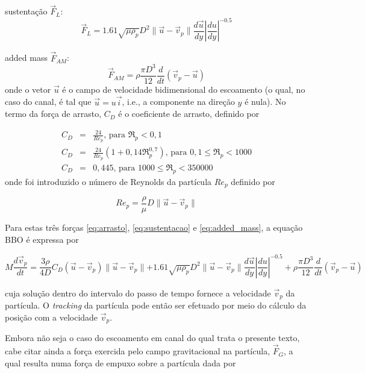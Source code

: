 sustentação $\vec{F}_L$:
\begin{equation}
\vec{F}_L = 1.61\sqrt{\mu\rho_p}D^2\parallel\vec{u}-\vec{v}_p\parallel\frac{d\vec{u}}{dy}\left|\frac{du}{dy}\right|^{-0.5}
\label{eq:sustentacao}
\end{equation}

added mass $\vec{F}_{AM}$:
\begin{equation}
\vec{F}_{AM} = \rho\frac{\pi D^3}{12}\frac{d}{dt}(\vec{v}_p-\vec{u})
\label{eq:added_mass}
\end{equation}
onde o vetor $\vec{u}$ é o campo de velocidade bidimensional do
escoamento (o qual, no caso do canal, é tal que $\vec{u}=u\vec{i}$,
i.e., a componente na direção $y$ é nula). No termo da força de arrasto,
$C_D$ é o coeficiente de arrasto, definido por \cite{PERRY99}

\begin{eqnarray}
	C_D &=& \frac{24}{Re_p}\text{, para }\Re_p< 0,1\nonumber\\
	C_D &=& \frac{24}{Re_p}\left(1+0,14\Re_p^{0,7}\right)\text{, para }0,1\leq\Re_p< 1000\\
	C_D &=& 0,445\text{, para }1000\leq\Re_p< 350000\nonumber
\end{eqnarray}
onde foi introduzido o número de Reynolds da partícula $Re_p$ definido
por

\begin{equation}
	Re_p = \frac{\rho}{\mu}D\parallel\vec{u}-\vec{v}_p\parallel
\end{equation}

Para estas três forças \ref{eq:arrasto}, \ref{eq:sustentacao} e
\ref{eq:added_mass}, a equação BBO é expressa por

\begin{equation}
	M\frac{d\vec{v}_p}{dt} = 
	\frac{3\rho}{4D}C_D(\vec{u}-\vec{v}_p)\parallel\vec{u}-\vec{v}_p\parallel
	+1.61\sqrt{\mu\rho_p}D^2\parallel\vec{u}-\vec{v}_p\parallel\frac{d\vec{u}}{dy}\left|\frac{du}{dy}\right|^{-0.5}
	+\rho\frac{\pi D^3}{12}\frac{d}{dt}(\vec{v}_p-\vec{u})
\end{equation}

cuja solução dentro do intervalo do passo de tempo fornece a velocidade
$\vec{v}_p$ da partícula. O {\it tracking} da partícula pode então ser
efetuado por meio do cálculo da posição com a velocidade $\vec{v}_p$.

Embora não seja o caso do escoamento em canal do qual trata o presente texto, cabe citar ainda a força exercida pelo campo gravitacional na partícula, $\vec{F}_G$, a qual resulta numa força de empuxo sobre a partícula dada por

